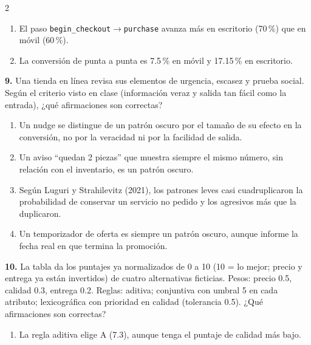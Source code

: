 \documentclass[10pt,letterpaper]{article}
\newcommand{\cas}{\framebox[1.0em]{\rule{0pt}{1.05ex}}}
\begin{document}
\begin{multicols}{2}
\begin{minipage}[t]{\columnwidth}
\begin{enumerate}[label=\cas\ \alph*),leftmargin=2.3em,itemsep=1.2pt,topsep=1pt,parsep=0pt,partopsep=0pt]
\item El paso \texttt{begin\_checkout}$\to$\texttt{purchase} avanza más en escritorio (70\,\%) que en móvil (60\,\%).
\item La conversión de punta a punta es 7.5\,\% en móvil y 17.15\,\% en escritorio.
\end{enumerate}\end{minipage}\par\vspace{3pt}
\begin{minipage}[t]{\columnwidth}\noindent\textbf{9.} Una tienda en línea revisa sus elementos de urgencia, escasez y prueba social. Según el criterio visto en clase (información veraz y salida tan fácil como la entrada), ¿qué afirmaciones son correctas?
\vspace{1pt}\begin{enumerate}[label=\cas\ \alph*),leftmargin=2.3em,itemsep=1.2pt,topsep=1pt,parsep=0pt,partopsep=0pt]
\item Un nudge se distingue de un patrón oscuro por el tamaño de su efecto en la conversión, no por la veracidad ni por la facilidad de salida.
\item Un aviso \enquote{quedan 2 piezas} que muestra siempre el mismo número, sin relación con el inventario, es un patrón oscuro.
\item Según Luguri y Strahilevitz (2021), los patrones leves casi cuadruplicaron la probabilidad de conservar un servicio no pedido y los agresivos más que la duplicaron.
\item Un temporizador de oferta es siempre un patrón oscuro, aunque informe la fecha real en que termina la promoción.
\end{enumerate}\end{minipage}\par\vspace{3pt}
\begin{minipage}[t]{\columnwidth}\noindent\textbf{10.} La tabla da los puntajes ya normalizados de 0 a 10 (10 = lo mejor; precio y entrega ya están invertidos) de cuatro alternativas ficticias. Pesos: precio 0.5, calidad 0.3, entrega 0.2. Reglas: aditiva; conjuntiva con umbral 5 en cada atributo; lexicográfica con prioridad en calidad (tolerancia 0.5). ¿Qué afirmaciones son correctas?
\vspace{1pt}\begin{enumerate}[label=\cas\ \alph*),leftmargin=2.3em,itemsep=1.2pt,topsep=1pt,parsep=0pt,partopsep=0pt]
\item La regla aditiva elige A (7.3), aunque tenga el puntaje de calidad más bajo.

\end{enumerate}
\end{minipage}
\end{multicols}
\end{document}
